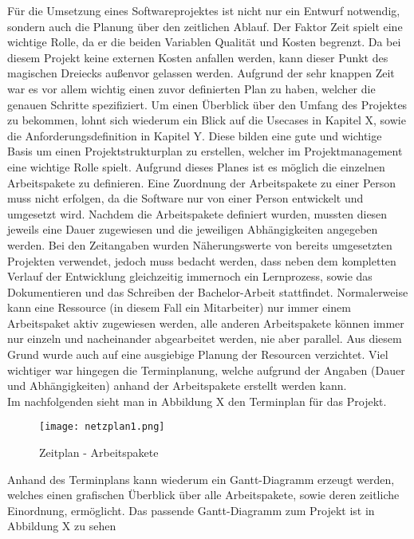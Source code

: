 Für die Umsetzung eines Softwareprojektes ist nicht nur ein Entwurf notwendig, sondern auch die Planung über den zeitlichen Ablauf. Der Faktor Zeit spielt eine wichtige Rolle, da er die beiden Variablen Qualität und Kosten begrenzt. Da bei diesem Projekt keine externen Kosten anfallen werden, kann dieser Punkt des magischen Dreiecks außenvor gelassen werden.
Aufgrund der sehr knappen Zeit war es vor allem wichtig einen zuvor definierten Plan zu haben, welcher die genauen Schritte spezifiziert. Um einen Überblick über den Umfang des Projektes zu bekommen, lohnt sich wiederum ein Blick auf die Usecases in Kapitel X, sowie die Anforderungsdefinition in Kapitel Y. Diese bilden eine gute und wichtige Basis um einen Projektstrukturplan zu erstellen, welcher im Projektmanagement eine wichtige Rolle spielt. Aufgrund dieses Planes ist es möglich die einzelnen Arbeitspakete zu definieren. Eine Zuordnung der Arbeitspakete zu einer Person muss nicht erfolgen, da die Software nur von einer Person entwickelt und umgesetzt wird. Nachdem die Arbeitspakete definiert wurden, mussten diesen jeweils eine Dauer zugewiesen und die jeweiligen Abhängigkeiten angegeben werden.
Bei den Zeitangaben wurden Näherungswerte von bereits umgesetzten Projekten verwendet, jedoch muss bedacht werden, dass neben dem kompletten Verlauf der Entwicklung gleichzeitig immernoch ein Lernprozess, sowie das Dokumentieren und das Schreiben der Bachelor-Arbeit stattfindet.  Normalerweise kann eine Ressource (in diesem Fall ein Mitarbeiter) nur immer einem Arbeitspaket aktiv zugewiesen werden, alle anderen Arbeitspakete können immer nur einzeln und nacheinander abgearbeitet werden, nie aber parallel. Aus diesem Grund wurde auch auf eine ausgiebige Planung der Resourcen verzichtet. Viel wichtiger war hingegen die Terminplanung, welche aufgrund der Angaben (Dauer und Abhängigkeiten) anhand der Arbeitspakete erstellt werden kann.\\
Im nachfolgenden sieht man in Abbildung X den Terminplan für das Projekt.\\

\begin{figure}[H]
\centering
\texttt{[image: netzplan1.png]}
\caption{Zeitplan - Arbeitspakete}
\label{fig:benchsnmpbulk}
\end{figure}

Anhand des Terminplans kann wiederum ein Gantt-Diagramm erzeugt werden, welches einen grafischen Überblick über alle Arbeitspakete, sowie deren zeitliche Einordnung, ermöglicht. Das passende Gantt-Diagramm zum Projekt ist in Abbildung X zu sehen

